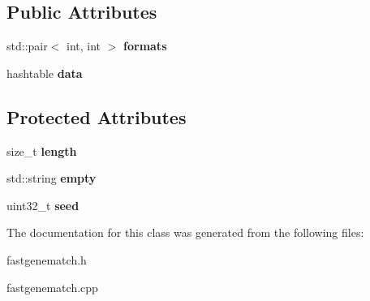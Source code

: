 \subsection*{Public Attributes}
\begin{DoxyCompactItemize}
\item 
\hypertarget{classfastgenematch_1_1Geneobject_ac1da8f2a744493726da5a2fbaef4f709}{
std::pair$<$ int, int $>$ {\bfseries formats}}
\label{classfastgenematch_1_1Geneobject_ac1da8f2a744493726da5a2fbaef4f709}

\item 
\hypertarget{classfastgenematch_1_1Geneobject_a3e6684c3c20db786ccec541e136afa8c}{
hashtable {\bfseries data}}
\label{classfastgenematch_1_1Geneobject_a3e6684c3c20db786ccec541e136afa8c}

\end{DoxyCompactItemize}
\subsection*{Protected Attributes}
\begin{DoxyCompactItemize}
\item 
\hypertarget{classfastgenematch_1_1Geneobject_a45670e89f2e7c70136b8d69027e9972c}{
size\_\-t {\bfseries length}}
\label{classfastgenematch_1_1Geneobject_a45670e89f2e7c70136b8d69027e9972c}

\item 
\hypertarget{classfastgenematch_1_1Geneobject_a60d4a4d6321022fd74d57b390e645e75}{
std::string {\bfseries empty}}
\label{classfastgenematch_1_1Geneobject_a60d4a4d6321022fd74d57b390e645e75}

\item 
\hypertarget{classfastgenematch_1_1Geneobject_afdb66b5183b05f3c15f6b73f691e8b57}{
uint32\_\-t {\bfseries seed}}
\label{classfastgenematch_1_1Geneobject_afdb66b5183b05f3c15f6b73f691e8b57}

\end{DoxyCompactItemize}


The documentation for this class was generated from the following files:\begin{DoxyCompactItemize}
\item 
fastgenematch.h\item 
fastgenematch.cpp\end{DoxyCompactItemize}
